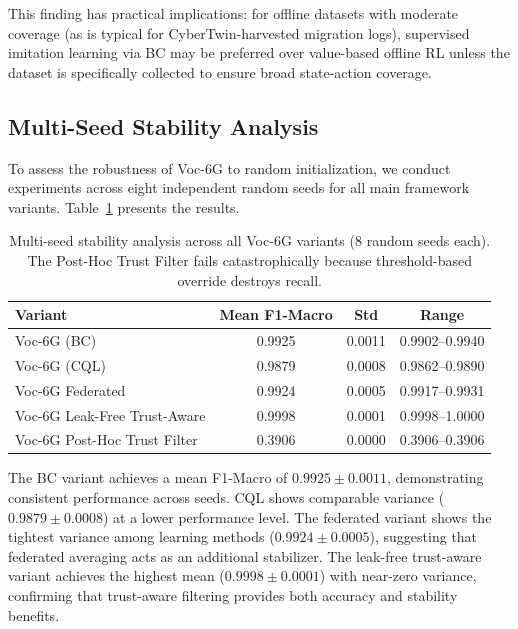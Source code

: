 \documentclass[journal,twoside]{IEEEtran}
\newcommand{\VocSixG}{Voc-6G}
\begin{document}
This finding has practical implications: for offline datasets with moderate coverage (as is typical for CyberTwin-harvested migration logs), supervised imitation learning via BC may be preferred over value-based offline RL unless the dataset is specifically collected to ensure broad state-action coverage.

\subsection{Multi-Seed Stability Analysis}

To assess the robustness of \VocSixG{} to random initialization, we conduct experiments across eight independent random seeds for all main framework variants. Table~\ref{tab:multiseed} presents the results.

\begin{table}[t]
\centering
\caption{Multi-seed stability analysis across all \VocSixG{} variants (8 random seeds each). The Post-Hoc Trust Filter fails catastrophically because threshold-based override destroys recall.}
\label{tab:multiseed}
\small
\begin{tabular}{lccc}
\toprule
\textbf{Variant} & \textbf{Mean F1-Macro} & \textbf{Std} & \textbf{Range} \\
\midrule
Voc-6G (BC)                          & 0.9925 & 0.0011 & 0.9902--0.9940 \\
Voc-6G (CQL)                         & 0.9879 & 0.0008 & 0.9862--0.9890 \\
Voc-6G Federated                      & 0.9924 & 0.0005 & 0.9917--0.9931 \\
Voc-6G Leak-Free Trust-Aware          & 0.9998 & 0.0001 & 0.9998--1.0000 \\
Voc-6G Post-Hoc Trust Filter          & 0.3906 & 0.0000 & 0.3906--0.3906 \\
\bottomrule
\end{tabular}
\end{table}

The BC variant achieves a mean F1-Macro of $0.9925 \pm 0.0011$, demonstrating consistent performance across seeds. CQL shows comparable variance ($0.9879 \pm 0.0008$) at a lower performance level. The federated variant shows the tightest variance among learning methods ($0.9924 \pm 0.0005$), suggesting that federated averaging acts as an additional stabilizer. The leak-free trust-aware variant achieves the highest mean ($0.9998 \pm 0.0001$) with near-zero variance, confirming that trust-aware filtering provides both accuracy and stability benefits.
\end{document}
